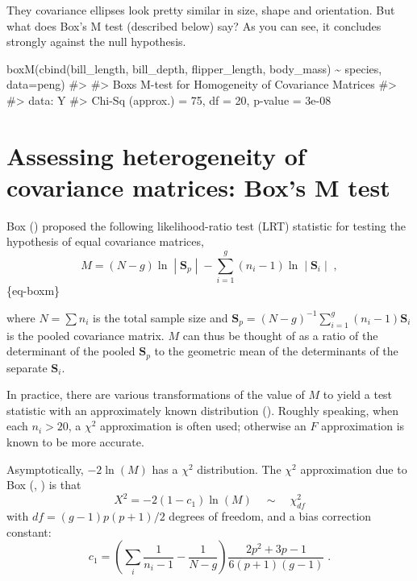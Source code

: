 \documentclass[
  letterpaper,
  10pt,
  krantz2]{krantz}
\makeatletter
\newenvironment{Shaded}{\begin{snugshade}}{\end{snugshade}}
\newcommand{\AttributeTok}[1]{\textcolor[rgb]{0.40,0.45,0.13}{#1}}
\newcommand{\CommentTok}[1]{\textcolor[rgb]{0.37,0.37,0.37}{#1}}
\newcommand{\FunctionTok}[1]{\textcolor[rgb]{0.28,0.35,0.67}{#1}}
\newcommand{\NormalTok}[1]{\textcolor[rgb]{0.00,0.23,0.31}{#1}}
\newcommand{\SpecialCharTok}[1]{\textcolor[rgb]{0.37,0.37,0.37}{#1}}
\newenvironment{kframe}{%
  \medskip{}
  \setlength{\fboxsep}{.8em}
  \def\at@end@of@kframe{}%
  \ifinner\ifhmode%
  \def\at@end@of@kframe{\end{minipage}}%
  \begin{minipage}{\columnwidth}%
  \fi\fi%
  \def\FrameCommand##1{\hskip\@totalleftmargin \hskip-\fboxsep
  \colorbox{shadecolor}{##1}\hskip-\fboxsep
      \hskip-\linewidth \hskip-\@totalleftmargin \hskip\columnwidth}%
  \MakeFramed {\advance\hsize-\width
    \@totalleftmargin\z@ \linewidth\hsize
    \@setminipage}}%
{\par\unskip\endMakeFramed%
  \at@end@of@kframe}
\renewenvironment{Shaded}{\begin{kframe}}{\end{kframe}}
\makeatother
\begin{document}
They covariance ellipses look pretty similar in size, shape and
orientation. But what does Box's M test (described below) say? As you
can see, it concludes strongly against the null hypothesis.

\begin{Shaded}
\begin{Highlighting}[]
\FunctionTok{boxM}\NormalTok{(}\FunctionTok{cbind}\NormalTok{(bill\_length, bill\_depth, flipper\_length, body\_mass) }\SpecialCharTok{\textasciitilde{}}\NormalTok{ species, }\AttributeTok{data=}\NormalTok{peng)}
\CommentTok{\#\textgreater{} }
\CommentTok{\#\textgreater{}  Box\textquotesingle{}s M{-}test for Homogeneity of Covariance Matrices}
\CommentTok{\#\textgreater{} }
\CommentTok{\#\textgreater{} data:  Y}
\CommentTok{\#\textgreater{} Chi{-}Sq (approx.) = 75, df = 20, p{-}value = 3e{-}08}
\end{Highlighting}
\end{Shaded}

\section{Assessing heterogeneity of covariance matrices: Box's M
test}\label{sec-boxM}

Box () proposed the following
likelihood-ratio test (LRT) statistic for testing the hypothesis of
equal covariance matrices, \[
M = (N -g) \ln \;|\; \mathbf{S}_p \;|\; - \sum_{i=1}^g (n_i -1) \ln \;|\; \mathbf{S}_i \;|\; \; ,
\] \{eq-boxm\}

where \(N = \sum n_i\) is the total sample size and
\(\mathbf{S}_p = (N-g)^{-1} \sum_{i=1}^g (n_i - 1) \mathbf{S}_i\) is the
pooled covariance matrix. \(M\) can thus be thought of as a ratio of the
determinant of the pooled \(\mathbf{S}_p\) to the geometric mean of the
determinants of the separate \(\mathbf{S}_i\).

In practice, there are various transformations of the value of \(M\) to
yield a test statistic with an approximately known distribution
(). Roughly speaking, when each
\(n_i > 20\), a \(\chi^2\) approximation is often used; otherwise an
\(F\) approximation is known to be more accurate.

Asymptotically, \(-2 \ln (M)\) has a \(\chi^2\) distribution. The
\(\chi^2\) approximation due to Box (,
) is that \[
X^2 = -2 (1-c_1) \ln (M) \quad \sim \quad \chi^2_{df}
\] with \(df = (g-1) p (p+1)/2\) degrees of freedom, and a bias
correction constant: \[
c_1 = \left( 
\sum_i \frac{1}{n_i -1}
- \frac{1}{N-g}
\right)
\frac{2p^2 +3p -1}{6 (p+1)(g-1)} \; .
\]
\end{document}
